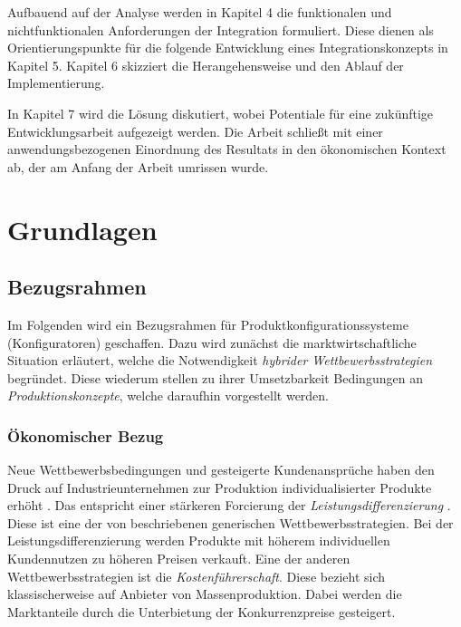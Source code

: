 \documentclass[11pt, a4paper, titlepage, listof=totoc, bibliography=totoc, index=totoc, twoside, openright, headings=normal]{scrreprt}
\begin{document}
Aufbauend auf der Analyse werden in Kapitel 4 die funktionalen und nichtfunktionalen Anforderungen der Integration formuliert. Diese dienen als Orientierungspunkte für die folgende Entwicklung eines Integrationskonzepts in Kapitel 5. Kapitel 6 skizziert die Herangehensweise und den Ablauf der Implementierung.

In Kapitel 7 wird die Lösung diskutiert, wobei Potentiale für eine zukünftige Entwicklungsarbeit aufgezeigt werden. Die Arbeit schließt mit einer anwendungsbezogenen Einordnung des Resultats in den ökonomischen Kontext ab, der am Anfang der Arbeit umrissen wurde.


\pagebreak

\chapter{Grundlagen}
\label{Grundlagen}
\section{Bezugsrahmen}
Im Folgenden wird ein Bezugsrahmen für Produktkonfigurationssysteme (Konfiguratoren) geschaffen. Dazu wird zunächst die marktwirtschaftliche Situation erläutert, welche die Notwendigkeit \emph{hybrider Wettbewerbsstrategien} begründet. Diese wiederum stellen zu ihrer Umsetzbarkeit Bedingungen an \emph{Produktionskonzepte}, welche daraufhin vorgestellt werden.

\subsection{Ökonomischer Bezug}
\label{oekonomischerBezug}
Neue Wettbewerbsbedingungen und gesteigerte Kundenansprüche haben den Druck auf Industrieunternehmen zur Produktion individualisierter Produkte erhöht \citep{piller98}. Das entspricht einer stärkeren Forcierung der \emph{Leistungsdifferenzierung} \citep{lutz11}. Diese ist eine der von \citet{porter02} beschriebenen \glqq generischen Wettbewerbsstrategien\grqq{}. Bei der Leistungsdifferenzierung werden Produkte mit höherem individuellen Kundennutzen zu höheren Preisen verkauft. Eine der anderen Wettbewerbsstrategien ist die \emph{Kostenführerschaft}. Diese bezieht sich klassischerweise auf Anbieter von Massenproduktion. Dabei werden die Marktanteile durch die Unterbietung der Konkurrenzpreise gesteigert.
\end{document}
